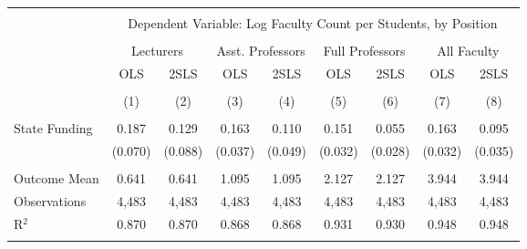 
\begin{tabular}{@{\extracolsep{5pt}}lcccccccc} 
\\[-1.8ex]\hline 
\hline \\[-1.8ex] 
 & \multicolumn{8}{c}{Dependent Variable: Log Faculty Count per Students, by Position} \\ 
\cline{2-9} 
\\[-1.8ex] & \multicolumn{2}{c}{Lecturers} & \multicolumn{2}{c}{Asst. Professors} & \multicolumn{2}{c}{Full Professors} & \multicolumn{2}{c}{All Faculty} \\ 
 & OLS & 2SLS & OLS & 2SLS & OLS & 2SLS & OLS & 2SLS \\ 
\\[-1.8ex] & (1) & (2) & (3) & (4) & (5) & (6) & (7) & (8)\\ 
\hline \\[-1.8ex] 
 State Funding & 0.187 & 0.129 & 0.163 & 0.110 & 0.151 & 0.055 & 0.163 & 0.095 \\ 
  & (0.070) & (0.088) & (0.037) & (0.049) & (0.032) & (0.028) & (0.032) & (0.035) \\ 
 \hline \\[-1.8ex] 
Outcome Mean & 0.641 & 0.641 & 1.095 & 1.095 & 2.127 & 2.127 & 3.944 & 3.944 \\ 
Observations & 4,483 & 4,483 & 4,483 & 4,483 & 4,483 & 4,483 & 4,483 & 4,483 \\ 
R$^{2}$ & 0.870 & 0.870 & 0.868 & 0.868 & 0.931 & 0.930 & 0.948 & 0.948 \\ 
\hline 
\hline \\[-1.8ex] 
\end{tabular} 
